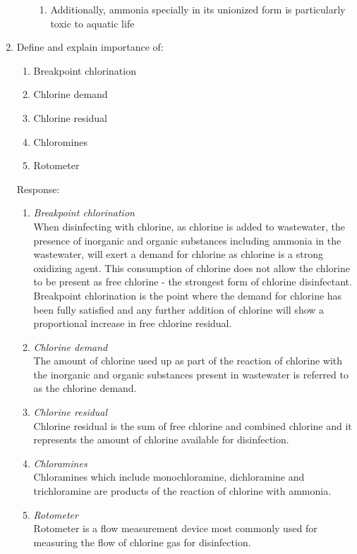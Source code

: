 \begin{enumerate}
\begin{enumerate}[label=\alph*]
\begin{enumerate}
\item Additionally, ammonia specially in its unionized form is particularly toxic to aquatic life
\end{enumerate}
\end{enumerate}
\pagebreak
\item Define and explain importance of:
\begin{enumerate}
\item Breakpoint chlorination
\item Chlorine demand
\item Chlorine residual
\item Chloromines
\item Rotometer
\end{enumerate}
Response:\\
\begin{enumerate}[label=\alph*]
\item \textit{Breakpoint chlorination}\\
When disinfecting with chlorine, as chlorine is added to wastewater, the presence of inorganic and organic substances including ammonia in the wastewater, will exert a demand for chlorine as chlorine is a strong oxidizing agent.  This consumption of chlorine does not allow the chlorine to be present as free chlorine - the strongest form of chlorine disinfectant.  Breakpoint chlorination is the point where the demand for chlorine has been fully satisfied and any further addition of chlorine will show a proportional increase in free chlorine residual.


\item \textit{Chlorine demand}\\
The amount of chlorine used up as part of the reaction of chlorine with the inorganic and organic substances present in wastewater is referred to as the chlorine demand.

\item \textit{Chlorine residual}\\
Chlorine residual is the sum of free chlorine and combined chlorine and it represents the amount of chlorine available for disinfection.

\item \textit{Chloramines}\\
Chloramines which include monochloramine, dichloramine and trichloramine are products of the reaction of chlorine with ammonia.

\item \textit{Rotometer}\\
Rotometer is a flow measurement device most commonly used for measuring the flow of chlorine gas for disinfection.
\end{enumerate}
\end{enumerate}